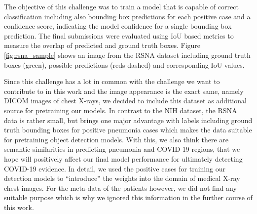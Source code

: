 The objective of this challenge was to train a model that is capable of correct classification including also bounding box predictions for each positive case and a confidence score, indicating the model confidence for a single bounding box prediction. The final submissions were evaluated using \ac{IoU} based metrics to measure the overlap of predicted and ground truth boxes. Figure \ref{fig:rsna_sample} shows an image from the \ac{RSNA} dataset including ground truth boxes (green), possible predictions (reds-dashed) and corresponding \ac{IoU} values.

Since this challenge has a lot in common with the challenge we want to contribute to in this work and the image appearance is the exact same, namely DICOM images of chest X-rays, we decided to include this dataset as additional source for pretraining our models. In contrast to the \ac{NIH} dataset, the \ac{RSNA} data is rather small, but brings one major advantage with labels including ground truth bounding boxes for positive pneumonia cases which makes the data suitable for pretraining object detection models. With this, we also think there are semantic similarities in predicting pneumonia and COVID-19 regions, that we hope will positively affect our final model performance for ultimately detecting COVID-19 evidence. In detail, we used the positive cases for training our detection models to \enquote{introduce} the weights into the domain of medical X-ray chest images. For the meta-data of the patients however, we did not find any suitable purpose which is why we ignored this information in the further course of this work.

